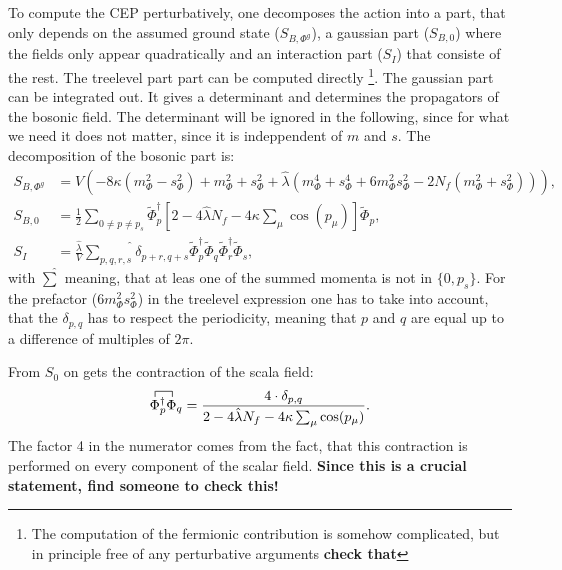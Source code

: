 To compute the CEP perturbatively, one decomposes the action into a part, that only depends on the assumed ground state ($S_{B,\Phi^g}$), 
a gaussian part ($S_{B,0}$) where the fields only appear quadratically and an interaction part ($S_I$) that consiste of the rest. The treelevel part 
part can be computed directly \footnote{The computation of the fermionic contribution is somehow complicated, but in principle 
free of any perturbative arguments \textbf{check that}}.  The gaussian part can be integrated out. It gives a determinant and determines the propagators 
of the bosonic field. The determinant will be ignored in the following, since for what we need it does not matter, since it is indeppendent of $m$ and $s$.
The decomposition of the bosonic part is:
\begin{align}
 S_{B,\Phi^g} &= V \left( -8 \kappa \left( m_{\Phi}^2 - s_{\Phi}^2 \right)  +  m_{\Phi}^2 + s_{\Phi}^2 
             + \hat\lambda \left( m_{\Phi}^4 + s_{\Phi}^4 + 6 m_{\Phi}^2s_{\Phi}^2 - 2 N_f \left(m_{\Phi}^2 + s_{\Phi}^2\right) \right) \right) ,
             \label{eq:BosonicTreelevelCEP} \\
 S_{B,0}      &= \frac{1}{2}  \sum\limits_{0\neq p \neq p_s}  \tilde\Phi_p^{\dagger}  
              \left[ 2 - 4 \hat\lambda N_f - 4 \kappa \sum_{\mu} \cos(p_{\mu}) \right]  \tilde\Phi_p ,
              \label{eq:BosonicGaussianCEP} \\
 S_I        &= \frac{\hat\lambda}{V} \widehat{\sum\limits_{p,q,r,s}}\delta_{p+r,q+s} \tilde\Phi_p^{\dagger} \tilde\Phi_q \tilde\Phi_r^{\dagger} \tilde\Phi_s,
              \label{eq:BosonicInteractionCEP}
\end{align}
with $\hat\sum$ meaning, that at leas one of the summed momenta is not in $\{0,p_s\}$. For the prefactor ($6 m_{\Phi}^2s_{\Phi}^2$) in the treelevel 
expression one has to take into account, that the $\delta_{p,q}$ has to respect the periodicity, meaning that $p$ and $q$ are equal up to a 
difference of multiples of $2\pi$.

From $S_0$ on gets the contraction of the scala field:
\begin{equation}\label{eq:ContractionOfBosonicField}
 \contraction{}{\Phi}{{}^\dagger_p}{\Phi{}}  \Phi^\dagger_p \Phi_q = \frac{4 \cdot \delta_{p,q}}{2 - 4 \hat\lambda N_f - 4 \kappa \sum_{\mu} \cos(p_{\mu}) }.
\end{equation}
The factor 4 in the numerator comes from the fact, that this contraction is performed on every component of the scalar field. \textbf{Since this is a crucial statement, find someone to check this!}

